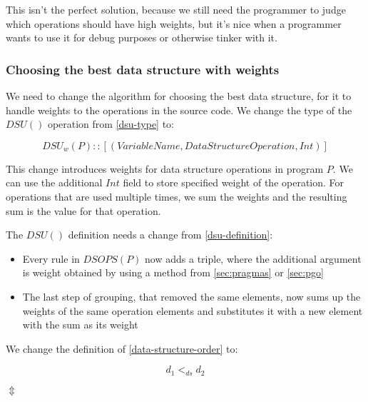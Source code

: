 \documentclass[a4paper,11pt]{article}
\begin{document}
			This isn't the perfect solution, because we still need the programmer to judge which operations
			should have high weights, but it's nice when a programmer wants to use it for debug purposes or
			otherwise tinker with it.

		\subsubsection{Choosing the best data structure with weights} \label{sec:choose-weights}

			We need to change the algorithm for choosing the best data structure, for it to handle weights
			to the operations in the source code. We change the type of the $DSU()$ operation from
			\autoref{dsu-type} to:

			\begin{equation}
				DSU_w(P) :: [(VariableName, DataStructureOperation, Int)]
			\end{equation}

			This change introduces weights for data structure operations in program $P$. We can use the
			additional $Int$ field to store specified weight of the operation.  For operations that are used
			multiple times, we sum the weights and the resulting sum is the value for that operation.

			The $DSU()$ definition needs a change from \autoref{dsu-definition}:

			\begin{itemize}
				\item Every rule in $DSOPS(P)$ now adds a triple, where the additional argument is
					weight obtained by using a method from \autoref{sec:pragmas} or
					\autoref{sec:pgo}

				\item The last step of grouping, that removed the same elements, now sums up the weights
					of the same operation elements and substitutes it with a new element with the
					sum as its weight
			\end{itemize}

            We change the definition of \autoref{data-structure-order} to:


            \begin{equation}
                d_1 <_{ds} d_2
            \end{equation}

            \begin{center}
                $\Updownarrow$
            \end{center}
\end{document}
